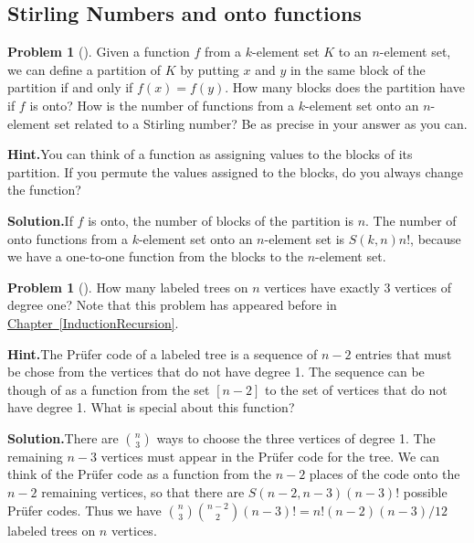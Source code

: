 \documentclass[10pt,]{book}
\theoremstyle{plain}
\theoremstyle{definition}
\newtheorem{activity}[project]{Problem}
\theoremstyle{definition}
\numberwithin{equation}{chapter}
\begin{document}
\subsection[{Stirling Numbers and onto functions}]{Stirling Numbers and onto functions}\label{subsection-28}
\begin{activity}[]\label{activity-143}
Given a function \(f\) from a \(k\)-element set \(K\) to an \(n\)-element set, we can define a partition of \(K\) by putting \(x\) and \(y\) in the same block of the partition if and only if \(f(x)=f(y)\). How many blocks does the partition have if \(f\) is onto? How is the number of functions from a \(k\)-element set onto an \(n\)-element set related to a Stirling number? Be as precise in your answer as you can.%
\par\medskip\noindent%
\textbf{Hint.}\quad You can think of a function as assigning values to the blocks of its partition. If you permute the values assigned to the blocks, do you always change the function?%
\par\medskip\noindent%
\textbf{Solution.}\quad If \(f\) is onto, the number of blocks of the partition is \(n\). The number of onto functions from a \(k\)-element set onto an \(n\)-element set is \(S(k,n)n!\), because we have a one-to-one function from the blocks to the \(n\)-element set.%
\end{activity}
\begin{activity}[]\label{activity-144}
How many labeled trees on \(n\) vertices have exactly 3 vertices of degree one?  Note that this problem has appeared before in \hyperref[InductionRecursion]{Chapter~\ref{InductionRecursion}}.%
\par\medskip\noindent%
\textbf{Hint.}\quad The Prüfer code of a labeled tree is a sequence of \(n-2\) entries that must be chose from the vertices that do not have degree 1. The sequence can be though of as a function from the set \([n-2]\) to the set of vertices that do not have degree 1. What is special about this function?%
\par\medskip\noindent%
\textbf{Solution.}\quad There are \(\binom{n}{3}\) ways to choose the three vertices of degree 1.  The remaining \(n-3\) vertices must appear in the Prüfer code for the tree.  We can think of the Prüfer code as a function from the \(n-2\) places of the code onto the \(n-2\) remaining vertices, so that there are \(S(n-2, n-3)(n-3)!\) possible Prüfer codes.  Thus we have \(\binom{n}{3}\binom{n-2}{2}(n-3)! = n!(n-2)(n-3)/12\) labeled trees on \(n\) vertices.%
\end{activity}
\end{document}
